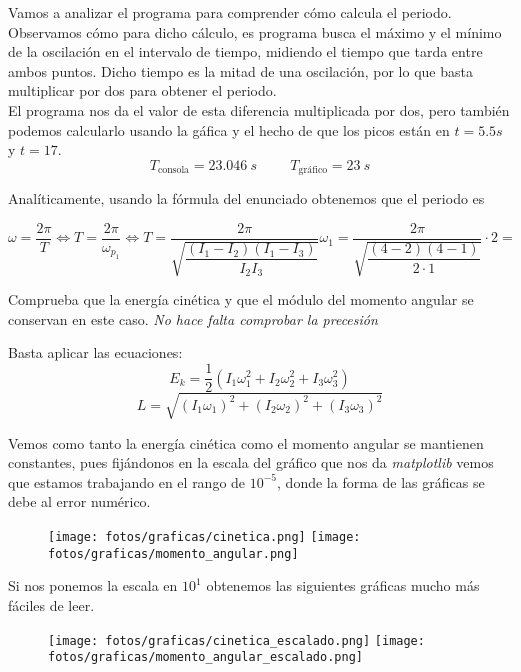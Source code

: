\documentclass[11pt]{article}
\newcommand{\laputa}[1]{\begin{note}{#1}{}\end{note}}
\begin{document}
            \noindent Vamos a analizar el programa para comprender cómo calcula el periodo. Observamos cómo para dicho cálculo, es programa busca el máximo y el mínimo de la oscilación en el intervalo de tiempo, midiendo el tiempo que tarda entre ambos puntos. Dicho tiempo es la mitad de una oscilación, por lo que basta multiplicar por dos para obtener el periodo.\\

			\noindent El programa nos da el valor de esta diferencia multiplicada por dos, pero también podemos calcularlo usando la gáfica y el hecho de que los picos están en $t=5.5s$ y $t=17$.
			\[T_\text{consola}=23.046\ s \hspace{1cm}T_\text{gráfico}=23\ s\]

            \noindent Analíticamente, usando la fórmula del enunciado obtenemos que el periodo es 

			\[\omega=\dfrac{2\pi}{T}\Longleftrightarrow T=\dfrac{2\pi}{\omega_{p_1}}\Longleftrightarrow T=\dfrac{2\pi}{\sqrt{\dfrac{(I_1-I_2)(I_1-I_3)}{I_2I_3}}}\omega_1=\dfrac{2\pi}{\sqrt{\dfrac{(4-2)(4-1)}{2\cdot 1}}}\cdot 2=\]

            \clearpage
            \laputa{Comprueba que la energía cinética y que el módulo del momento angular se conservan en este caso. \textit{No hace falta comprobar la precesión}}
				\noindent Basta aplicar las ecuaciones:
				\[E_k=\dfrac12\left(I_1\omega_1^2+I_2\omega_2^2+I_3\omega_3^2\right)\]
				\[L=\sqrt{(I_1\omega_1)^2+(I_2\omega_2)^2+(I_3\omega_3)^2}\]

				\noindent Vemos como tanto la energía cinética como el momento angular se mantienen constantes, pues fijándonos en la escala del gráfico que nos da \textit{matplotlib} vemos que estamos trabajando en el rango de $10^{-5}$, donde la forma de las gráficas se debe al error numérico.\\
				\begin{figure}[h]
					\vspace{-0.2cm}
					\centering
					\texttt{[image: fotos/graficas/cinetica.png]}
					\texttt{[image: fotos/graficas/momento\_angular.png]}
				\end{figure}

				\noindent Si nos ponemos la escala en $10^1$ obtenemos las siguientes gráficas mucho más fáciles de leer.
				\begin{figure}[h]
					\vspace{-0.3cm}
					\centering
					\texttt{[image: fotos/graficas/cinetica\_escalado.png]}
					\texttt{[image: fotos/graficas/momento\_angular\_escalado.png]}
				\end{figure}
\end{document}
